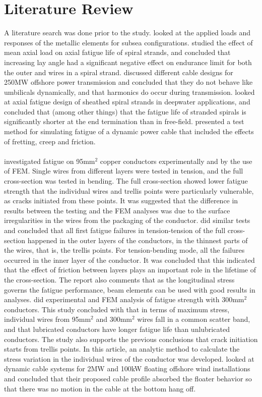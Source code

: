 \section{Literature Review}
A literature search was done prior to the study. \cite{Feld1995} looked at the applied loads and responses of the metallic elements for subsea configurations. \cite{Alani1997Eoma} studied the effect of mean axial load on axial fatigue life of spiral strands, and concluded that increasing lay angle had a significant negative effect on endurance limit for both the outer and wires in a spiral strand. \cite{Chien2004} discussed different cable designs for 250MW offshore power transmission and concluded that they do not behave like umbilicals dynamically, and that harmonics do occur during transmission. \cite{Raoof2008} looked at axial fatigue design of sheathed spiral strands in deepwater applications, and concluded that (among other things) that the fatigue life of stranded spirals is significantly shorter at the end termination than in free-field. \cite{Karlsen2010} presented a test method for simulating fatigue of a dynamic power cable that included the effects of fretting, creep and friction.\\\\ \cite{Nasution2013} investigated fatigue on 95mm$^2$ copper conductors experimentally and by the use of FEM. Single wires from different layers were tested in tension, and the full cross-section was tested in bending. The full cross-section showed lower fatigue strength that the individual wires and trellis points were particularly vulnerable, as cracks initiated from these points. It was suggested that the difference in results between the testing and the FEM analyses was due to the surface irregularities in the wires from the packaging of the conductor. \cite{NASUTION2014} did similar tests and concluded that all first fatigue failures in tension-tension of the full cross-section happened in the outer layers of the conductors, in the thinnest parts of the wires, that is, the trellis points. For tension-bending mode, all the failures occurred in the inner layer of the conductor. It was concluded that this indicated that the effect of friction between layers plays an important role in the lifetime of the cross-section. The report also comments that as the longitudinal stress governs the fatigue performance, beam elements can be used with good results in analyses. \cite{s300} did experimental and FEM analysis of fatigue strength with 300mm$^2$ conductors. This study concluded with that in terms of maximum stress, individual wires from 95mm$^2$  and 300mm$^2$ wires fall in a common scatter band, and that lubricated conductors have longer fatigue life than unlubricated conductors. The study also supports the previous conclusions that crack initiation starts from trellis points. In this article, an analytic method to calculate the stress variation in the individual wires of the conductor was developed. \cite{Taninok2017} looked at dynamic cable systems for 2MW and 100kW floating offshore wind installations and concluded that their proposed cable profile absorbed the floater behavior so that there was no motion in the cable at the bottom hang off.  

